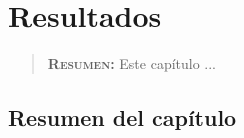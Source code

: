 
\chapter{Resultados}
\label{ch:resultados}

\begin{quote}
  {\bf\textsc{Resumen:}} Este capítulo ...
\end{quote}


\section{Resumen del capítulo}








